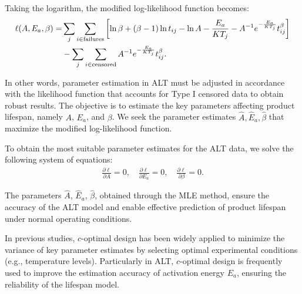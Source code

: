 Taking the logarithm, the modified log-likelihood function becomes:
\begin{align}
\ell(A, E_a, \beta) = &\sum_j \sum_{i \in \text{failures}} \left[ \ln \beta + (\beta - 1) \ln t_{ij} - \ln A - \frac{E_a}{K T_j} - A^{-1} e^{-\frac{E_a}{K T_j}} t_{ij}^\beta \right]  \notag \\
&- \sum_j \sum_{i \in \text{censored}} A^{-1} e^{-\frac{E_a}{K T_j}} t_{ij}^\beta.  \notag
\end{align}

\hspace*{8mm} In other words, parameter estimation in ALT must be adjusted in accordance with the likelihood function that accounts for Type I censored data to obtain robust results. The objective is to estimate the key parameters affecting product lifespan, namely $A$, $E_a$, and $\beta$. We seek the parameter estimates $\hat{A}, \hat{E}_a, \hat{\beta}$ that maximize the modified log-likelihood function.

\hspace*{8mm} To obtain the most suitable parameter estimates for the ALT data, we solve the following system of equations:
\begin{align*}
    \frac{\partial \ell}{\partial A} = 0, \quad \frac{\partial \ell}{\partial E_a} = 0, \quad \frac{\partial \ell}{\partial \beta} = 0.
\end{align*}

\hspace*{8mm} The parameters $\hat{A}$, $\hat{E}_a$, $\hat{\beta}$, obtained through the MLE method, ensure the accuracy of the ALT model and enable effective prediction of product lifespan under normal operating conditions.

\hspace*{8mm} In previous studies, $c$-optimal design has been widely applied to minimize the variance of key parameter estimates by selecting optimal experimental conditions (e.g., temperature levels). Particularly in ALT, $c$-optimal design is frequently used to improve the estimation accuracy of activation energy $E_a $, ensuring the reliability of the lifespan model.

